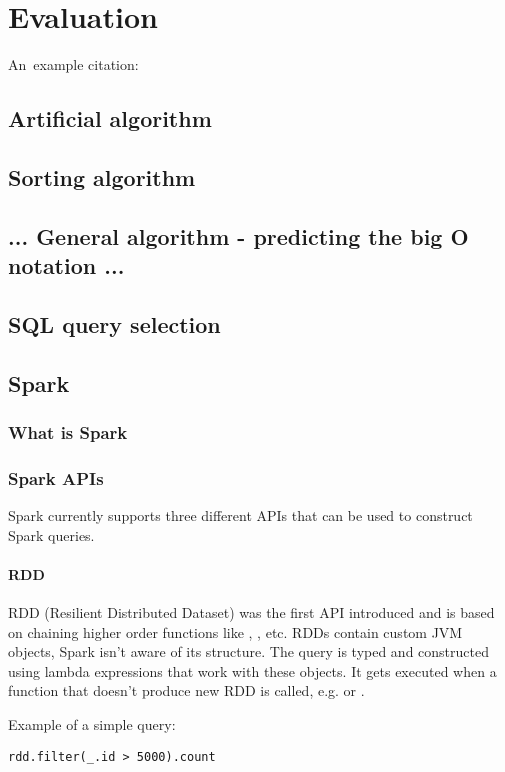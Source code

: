 \chapter{Evaluation}

An~example citation: \cite{Andel07}


\section{Artificial algorithm}
\section{Sorting algorithm}
\section{... General algorithm - predicting the big O notation ...}
\section{SQL query selection}
\section{Spark}
\subsection{What is Spark}

\subsection{Spark APIs}

Spark currently supports three different APIs that can be used to construct Spark queries.

\subsubsection{RDD}

RDD (Resilient Distributed Dataset) was the first API introduced and is based on chaining higher order functions like , , etc. RDDs contain custom JVM objects, Spark isn't aware of its structure. The query is typed and constructed using lambda expressions that work with these objects. It gets executed when a function that doesn't produce new RDD is called, e.g.  or . 

Example of a simple query:
\lstset{style=Scala}
\begin{lstlisting}
rdd.filter(_.id > 5000).count
\end{lstlisting}

